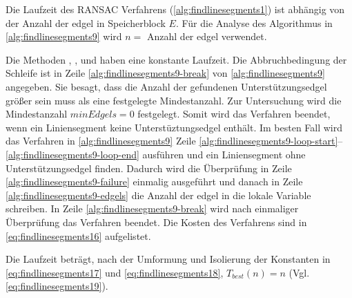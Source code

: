 Die Laufzeit des RANSAC Verfahrens (\autoref{alg:findlinesegments1}) ist abhängig von der Anzahl der \gls{edgel} in
 Speicherblock $E$. Für die Analyse des Algorithmus in \autoref{alg:findlinesegments9} wird $n = $ Anzahl der
 \gls{edgel} verwendet.

Die Methoden , ,  und 
 haben eine konstante Laufzeit. Die Abbruchbedingung der Schleife ist in Zeile \ref{alg:findlinesegments9-break} von
 \autoref{alg:findlinesegments9} angegeben. Sie besagt, dass die Anzahl der gefundenen Unterstützungsedgel größer sein
 muss als eine festgelegte Mindestanzahl. Zur Untersuchung wird die Mindestanzahl $\mathit{minEdgels} = 0$ festgelegt.
 Somit wird das Verfahren beendet, wenn ein Liniensegment keine Unterstüztungsedgel enthält. Im besten Fall wird das
 Verfahren in \autoref{alg:findlinesegments9} Zeile
 \ref{alg:findlinesegments9-loop-start}--\ref{alg:findlinesegments9-loop-end} ausführen und ein Liniensegment ohne
 Unterstützungsedgel finden. Dadurch wird die Überprüfung in Zeile \ref{alg:findlinesegments9-failure} einmalig
 ausgeführt und danach in Zeile \ref{alg:findlinesegments9-edgels} die Anzahl der \gls{edgel} in die lokale Variable
 schreiben. In Zeile \ref{alg:findlinesegments9-break} wird nach einmaliger Überprüfung das Verfahren beendet. Die
 Kosten des Verfahrens sind in \autoref{eq:findlinesegments16} aufgelistet.

Die Laufzeit beträgt, nach der Umformung und Isolierung der Konstanten in \autoref{eq:findlinesegments17} und
 \autoref{eq:findlinesegments18}, $T_{best}(n) = n$ (Vgl. \autoref{eq:findlinesegments19}).

